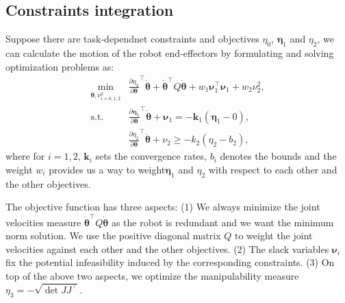 \documentclass[letterpaper, 10 pt, conference]{ieeeconf}  %
\newcommand{\bs}{\boldsymbol}
\begin{document}
\subsection{Constraints integration}
\label{sec:integration}
Suppose there are 
task-dependnet constraints and objectives  $\eta_0$, $\boldsymbol{\eta}_1$ and $\eta_2$, we can calculate the motion of the robot end-effectors by formulating and solving optimization problems as:
\cite{wangIFAC2014} 
\begin{equation*}
\begin{aligned}
\min_{\dot{\bs{\theta}}, \nu^2_{i=0,1,2}} & \frac{\partial \eta_3}{\partial \boldsymbol{\theta}}^{\top}\dot{\boldsymbol{ \theta}}+\dot{\boldsymbol{ \theta}}^{\top}Q\dot{\boldsymbol{ \theta}}
   + w_1 \boldsymbol{\nu}^{\top}_1\boldsymbol{\nu}_1 
+ w_2\nu^2_2 ,
  \\
  \mbox{s.t.}%
  &
  \frac{\partial \boldsymbol{\eta}_1}{\partial \boldsymbol{\theta}}^{\top}\dot{\boldsymbol{\theta}} + \boldsymbol{\nu}_1
  = -\boldsymbol{k}_1(\boldsymbol{\eta}_1 - 0), \\%
  & 
  \frac{\partial \eta_2}{\partial \boldsymbol{\theta }}^{\top}\dot{\boldsymbol{\theta}} + \nu_2
  \geq -k_2 ( 
  \eta_2 - b_2), %
\end{aligned}
\end{equation*}
where for $i=1,2$,  $\boldsymbol{k}_i$ sets the convergence rates, $b_i$ denotes the bounds
and the weight $w_i$ provides us  a way to weight$\boldsymbol{\eta}_1$ and $\eta_2$ with respect to each other and the other objectives.

The  objective function has three aspects: 
(1) We always minimize the joint velocities measure  $\dot{\boldsymbol{\theta}}^{\top}Q\dot{\boldsymbol{\theta}}$ as the robot is redundant and we want the minimum norm solution. We use the positive diagonal matrix $Q$ to weight the joint velocities against each other and the other objectives.
(2) The slack variables
$\boldsymbol{\nu}_i$ fix the potential infeasibility induced by the corresponding constraints.  
(3) On top of the above two aspects, we optimize the manipulability measure $\eta_3 = -\sqrt{\det JJ^\top}$.   
\end{document}
